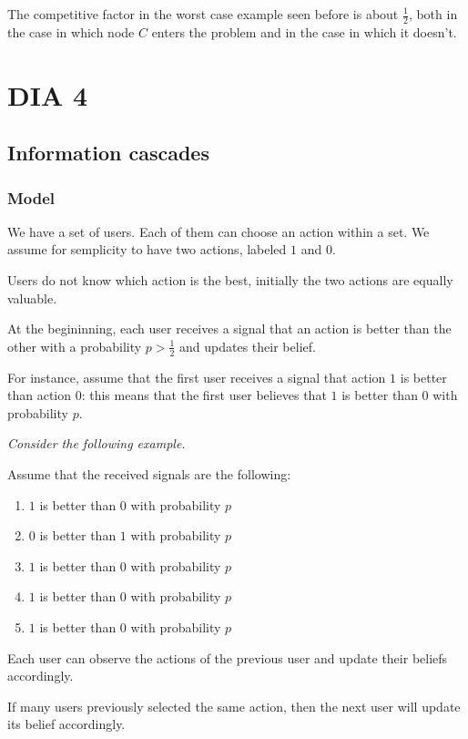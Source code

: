 \documentclass[10pt,a4paper]{article}
\begin{document}
The competitive factor in the worst case example seen before is about $\frac{1}{2}$, both in the case in which node $C$ enters the problem and in the case in which it doesn't.

\section{DIA 4}\label{dia-4}

\subsection{Information cascades}\label{information-cascades}

\subsubsection{Model}\label{model}

We have a set of users. Each of them can choose an action within a set. We assume for semplicity to have two actions, labeled $1$ and $0$.

Users do not know which action is the best, initially the two actions are equally valuable.

At the begininning, each user receives a signal that an action is better than the other with a probability $p > \frac{1}{2}$ and updates their belief.

For instance, assume that the first user receives a signal that action $1$ is better than action $0$: this means that the first user believes that $1$ is better than $0$ with probability $p$.

\textit{Consider the following example.}

Assume that the received signals are the following:
\begin{enumerate}
\item $1$ is better than $0$ with probability $p$
\item $0$ is better than $1$ with probability $p$
\item $1$ is better than $0$ with probability $p$
\item $1$ is better than $0$ with probability $p$
\item $1$ is better than $0$ with probability $p$
\end{enumerate}

Each user can observe the actions of the previous user and update their beliefs accordingly.

If many users previously selected the same action, then the next user will update its belief accordingly.
\end{document}
